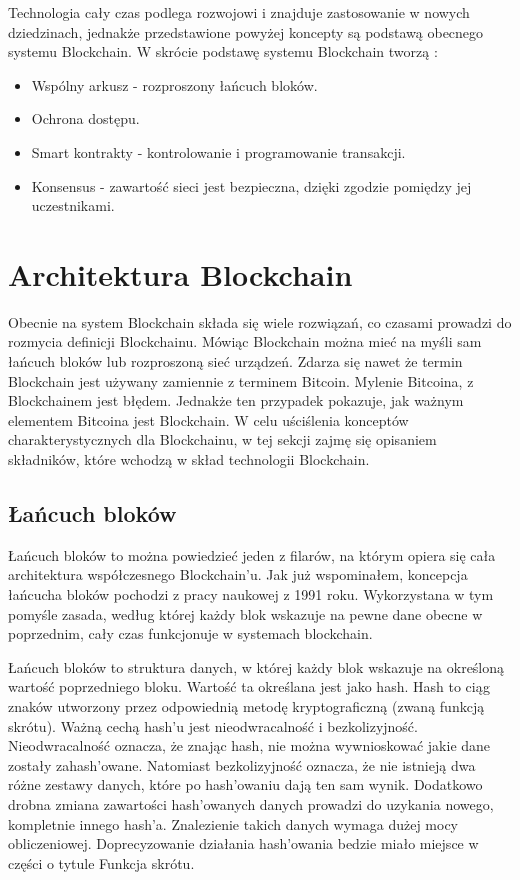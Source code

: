 \documentclass[a4paper,13pt]{report}
\begin{document}
Technologia cały czas podlega rozwojowi i znajduje zastosowanie w nowych dziedzinach, jednakże przedstawione powyżej koncepty są podstawą obecnego systemu Blockchain. W skrócie podstawę systemu Blockchain tworzą \cite{4-concepts}:
\begin{itemize}
	\item Wspólny arkusz - rozproszony łańcuch bloków.
	\item Ochrona dostępu.
	\item Smart kontrakty - kontrolowanie i programowanie transakcji.
	\item Konsensus - zawartość sieci jest bezpieczna, dzięki zgodzie pomiędzy jej uczestnikami.
\end{itemize}

\section{Architektura Blockchain}

Obecnie na system Blockchain składa się wiele rozwiązań, co czasami prowadzi do rozmycia definicji Blockchainu. Mówiąc Blockchain można mieć na myśli  sam łańcuch bloków lub rozproszoną sieć urządzeń. Zdarza się nawet że termin Blockchain jest używany zamiennie z terminem Bitcoin\cite{bitcoin-vs-blockchain}. Mylenie Bitcoina, z Blockchainem jest błędem. Jednakże ten przypadek pokazuje, jak ważnym elementem Bitcoina jest Blockchain. W celu uściślenia konceptów charakterystycznych dla Blockchainu, w tej sekcji zajmę się opisaniem składników, które wchodzą w skład technologii Blockchain.

\subsection{Łańcuch bloków}

Łańcuch bloków to można powiedzieć jeden z filarów, na którym opiera się cała architektura współczesnego Blockchain'u. Jak już wspominałem, koncepcja łańcucha bloków pochodzi z pracy naukowej z 1991 roku. Wykorzystana w tym pomyśle zasada, według której każdy blok wskazuje na pewne dane obecne w poprzednim, cały czas funkcjonuje w systemach blockchain.

Łańcuch bloków to struktura danych, w której każdy blok wskazuje na określoną wartość poprzedniego bloku. Wartość ta określana jest jako hash. Hash to ciąg znaków utworzony przez odpowiednią metodę kryptograficzną (zwaną funkcją skrótu). Ważną cechą hash'u jest nieodwracalność i bezkolizyjność. Nieodwracalność oznacza, że znając hash, nie można wywnioskować jakie dane zostały zahash'owane. Natomiast bezkolizyjność oznacza, że nie istnieją dwa różne zestawy danych, które po hash'owaniu dają ten sam wynik. Dodatkowo drobna zmiana zawartości hash'owanych danych prowadzi do uzykania nowego, kompletnie innego hash'a. Znalezienie takich danych wymaga dużej mocy obliczeniowej\cite{hash}. Doprecyzowanie działania hash'owania bedzie miało miejsce w części o tytule Funkcja skrótu.
\end{document}
